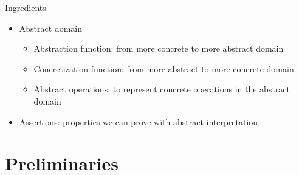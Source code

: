 \documentclass[11pt,svgnames,smaller,aspectratio=43,english]{beamer}
\begin{document}
\begin{frame}{Ingredients}
	\begin{itemize}[<+->]
		\item Abstract domain
		\begin{itemize}[<+->]
			\item Abstraction function: from more concrete to more abstract domain
			\item Concretization function: from more abstract to more concrete domain
			\item Abstract operations: to represent concrete operations in the abstract domain
		\end{itemize}
		\item Assertions: properties we can prove with abstract interpretation
	\end{itemize}
\end{frame}

\section{Preliminaries}
\end{document}
